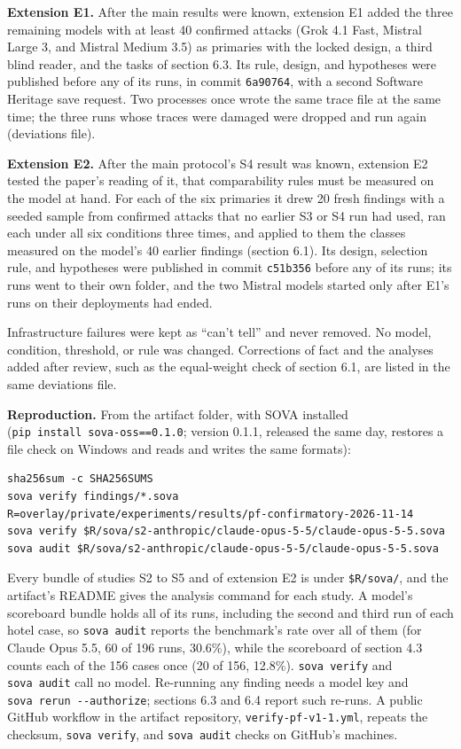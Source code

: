 \documentclass[
  american,
  10pt,
  a4paper,
]{article}
\begin{document}
\textbf{Extension E1.} After the main results were known, extension E1
added the three remaining models with at least 40 confirmed attacks
(Grok 4.1 Fast, Mistral Large 3, and Mistral Medium 3.5) as primaries
with the locked design, a third blind reader, and the tasks of section
6.3. Its rule, design, and hypotheses were published before any of its
runs, in commit \texttt{6a90764}, with a second Software Heritage save
request. Two processes once wrote the same trace file at the same time;
the three runs whose traces were damaged were dropped and run again
(deviations file).

\textbf{Extension E2.} After the main protocol's S4 result was known,
extension E2 tested the paper's reading of it, that comparability rules
must be measured on the model at hand. For each of the six primaries it
drew 20 fresh findings with a seeded sample from confirmed attacks that
no earlier S3 or S4 run had used, ran each under all six conditions
three times, and applied to them the classes measured on the model's 40
earlier findings (section 6.1). Its design, selection rule, and
hypotheses were published in commit \texttt{c51b356} before any of its
runs; its runs went to their own folder, and the two Mistral models
started only after E1's runs on their deployments had ended.

Infrastructure failures were kept as ``can't tell'' and never removed.
No model, condition, threshold, or rule was changed. Corrections of fact
and the analyses added after review, such as the equal-weight check of
section 6.1, are listed in the same deviations file.

\textbf{Reproduction.} From the artifact folder, with SOVA installed
(\texttt{pip\ install\ sova-oss==0.1.0}; version 0.1.1, released the
same day, restores a file check on Windows and reads and writes the same
formats):

\begin{verbatim}
sha256sum -c SHA256SUMS
sova verify findings/*.sova
R=overlay/private/experiments/results/pf-confirmatory-2026-11-14
sova verify $R/sova/s2-anthropic/claude-opus-5-5/claude-opus-5-5.sova
sova audit $R/sova/s2-anthropic/claude-opus-5-5/claude-opus-5-5.sova
\end{verbatim}

Every bundle of studies S2 to S5 and of extension E2 is under
\texttt{\$R/sova/}, and the artifact's README gives the analysis command
for each study. A model's scoreboard bundle holds all of its runs,
including the second and third run of each hotel case, so
\texttt{sova\ audit} reports the benchmark's rate over all of them (for
Claude Opus 5.5, 60 of 196 runs, 30.6\%), while the scoreboard of
section 4.3 counts each of the 156 cases once (20 of 156, 12.8\%).
\texttt{sova\ verify} and \texttt{sova\ audit} call no model. Re-running
any finding needs a model key and \texttt{sova\ rerun\ -\/-authorize};
sections 6.3 and 6.4 report such re-runs. A public GitHub workflow in
the artifact repository, \texttt{verify-pf-v1-1.yml}, repeats the
checksum, \texttt{sova\ verify}, and \texttt{sova\ audit} checks on
GitHub's machines.
\end{document}
